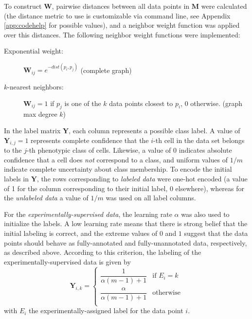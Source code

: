 \documentclass[oneside, a4paper, draft]{memoir} %
\begin{document}
To construct $\mathbf{W}$, pairwise distances between all data points in $\mathbf{M}$ were calculated (the 
distance metric to use is customizable via command line, see Appendix \ref{app:codehelp} for possible values), and a
neighbor weight function was applied over this distances. The following neighbor weight functions were implemented:
\begin{description}
	\item[Exponential weight:] $\mathbf{W}_{ij} = e^{-dist(p_i,p_j)}$ (complete graph)
	\item[$k$-nearest neighbors:] $\mathbf{W}_{ij} = 1$ if $p_j$ is one of the $k$ data points closest
		to $p_i$, 0 otherwise. (graph max degree $k$)
\end{description}

In the label matrix $\mathbf Y$, each column represents a possible class label. A value of $\mathbf{Y}_{i,j}=1$
represents complete confidence that the $i$-th cell in the data set belongs to the $j$-th phenotypic class of cells.
Likewise, a value of $0$ indicates absolute confidence that a cell does \emph{not} correspond to a class, and uniform 
values of $1/m$ indicate complete uncertainty about class membership. To encode the initial labels in $\mathbf Y$,
the rows corresponding to \emph{labeled data} were one-hot encoded (a value of 1 for the column
corresponding to their initial label, 0 elsewhere), whereas for the \emph{unlabeled data} a value of $1/m$ was used on
all label columns.

For the \emph{experimentally-supervised data}, the learning rate $\alpha$ was also used to initialize the labels.
A low learning rate means that there is strong belief that the initial labeling is correct, and the extreme values
of $0$ and $1$ suggest that the data points should behave as fully-annotated and fully-unannotated data, respectively,
as described above. According to this criterion, the labeling of the experimentally-supervised data is given by
\begin{equation}
	\mathbf Y_{i,k}  = \begin{cases}
		\dfrac{1}{\alpha(m-1)+1} & \text{if } E_i = k \\[1.2em]
		\dfrac{\alpha}{\alpha(m-1)+1} & \text{otherwise}\\
	\end{cases}
\end{equation}
with $E_i$ the experimentally-assigned label for the data point $i$.
\end{document}
